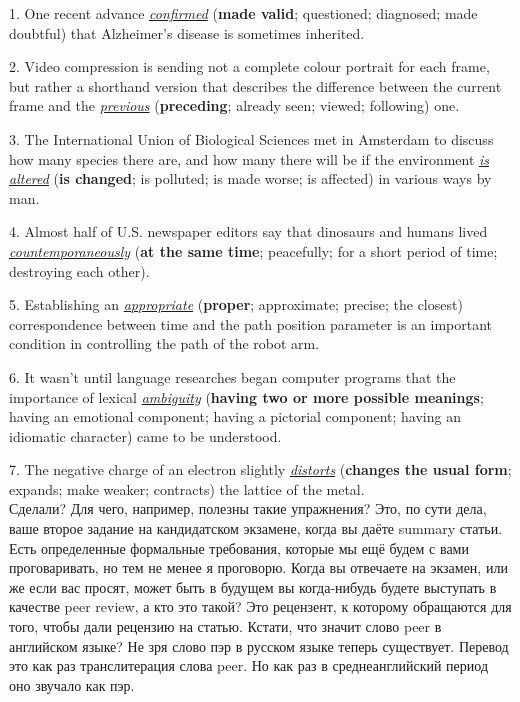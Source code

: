 \documentclass[main.tex]{subfiles}
\begin{document}
1. One recent advance \textit{\underline{confirmed}} (\textbf{made valid}; questioned; diagnosed; made doubtful) that Alzheimer's disease is sometimes inherited.

2. Video compression is sending not a complete colour portrait for each frame, but rather a shorthand version that describes the difference between the current frame and the \textit{\underline{previous}} (\textbf{preceding}; already seen; viewed; following) one.

3. The International Union of Biological Sciences met in Amsterdam to discuss how many species there are, and how many there will be if the environment \textit{\underline{is altered}} (\textbf{is changed}; is polluted; is made worse; is affected) in various ways by man. 

4. Almost half of U.S. newspaper editors say that dinosaurs and humans lived \textit{\underline{countemporaneously}} (\textbf{at the same time}; peacefully; for a short period of time; destroying each other).

5. Establishing an \textit{\underline{appropriate}} (\textbf{proper}; approximate; precise; the closest) correspondence between time and the path position parameter is an important condition in controlling the path of the robot arm.

6. It wasn't until language researches began computer programs that the importance of lexical \textit{\underline{ambiguity}} (\textbf{having two or more possible meanings}; having an emotional component; having a pictorial component; having an idiomatic character) came to be understood.

7. The negative charge of an electron slightly \textit{\underline{distorts}} (\textbf{changes the usual form}; expands; make weaker; contracts) the lattice of the metal.
\\

Сделали?
Для чего, например, полезны такие упражнения?
Это, по сути дела, ваше второе задание на кандидатском экзамене, когда вы даёте summary статьи.
Есть определенные формальные требования, которые мы ещё будем с вами проговаривать, но тем не менее я проговорю.
Когда вы отвечаете на экзамен, или же если вас просят, может быть в будущем вы когда-нибудь будете выступать в качестве peer review, а кто это такой?
Это рецензент, к которому обращаются для того, чтобы дали рецензию на статью.
Кстати, что значит слово peer в английском языке?
Не зря слово пэр в русском языке теперь существует.
Перевод это как раз транслитерация слова peer.
Но как раз в среднеанглийский период оно звучало как пэр.
\end{document}
